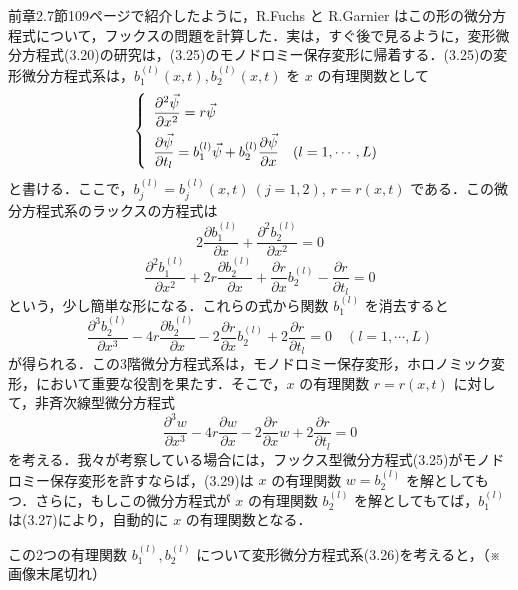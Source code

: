 \begin{story}
前章2.7節109ページで紹介したように，R.Fuchs と R.Garnier はこの形の微分方程式について，フックスの問題を計算した．実は，すぐ後で見るように，変形微分方程式(3.20)の研究は，(3.25)のモノドロミー保存変形に帰着する．(3.25)の変形微分方程式系は，$b_1^{(l)}(x,t), b_2^{(l)}(x,t)$ を $x$ の有理関数として
\begin{equation}
\left\{
\begin{array}{l}
    \displaystyle \frac{\partial^2 \vec{\psi}}{\partial x^2} = r\vec{\psi} \vspace{0.5em} \\
    \displaystyle \frac{\partial \vec{\psi}}{\partial t_l} = b_1^{(l)}\vec{\psi} + b_2^{(l)}\frac{\partial \vec{\psi}}{\partial x} \quad (l=1,\cdots,L)
\end{array}
\right. \label{eq:3.26}
\end{equation}
と書ける．ここで，$b_j^{(l)} = b_j^{(l)}(x,t) \ (j=1,2)$, $r = r(x,t)$ である．この微分方程式系のラックスの方程式は
\begin{equation}
    2\frac{\partial b_1^{(l)}}{\partial x} + \frac{\partial^2 b_2^{(l)}}{\partial x^2} = 0 \label{eq:3.27}
\end{equation}
\begin{equation}
    \frac{\partial^2 b_1^{(l)}}{\partial x^2} + 2r\frac{\partial b_2^{(l)}}{\partial x} + \frac{\partial r}{\partial x}b_2^{(l)} - \frac{\partial r}{\partial t_l} = 0 \label{eq:3.28}
\end{equation}
という，少し簡単な形になる．これらの式から関数 $b_1^{(l)}$ を消去すると
\begin{equation*}
    \frac{\partial^3 b_2^{(l)}}{\partial x^3} - 4r\frac{\partial b_2^{(l)}}{\partial x} - 2\frac{\partial r}{\partial x}b_2^{(l)} + 2\frac{\partial r}{\partial t_l} = 0 \quad (l=1,\cdots,L)
\end{equation*}
が得られる．この3階微分方程式系は，モノドロミー保存変形，ホロノミック変形，において重要な役割を果たす．そこで，$x$ の有理関数 $r = r(x,t)$ に対して，非斉次線型微分方程式
\begin{equation}
    \frac{\partial^3 w}{\partial x^3} - 4r\frac{\partial w}{\partial x} - 2\frac{\partial r}{\partial x}w + 2\frac{\partial r}{\partial t_l} = 0 \label{eq:3.29}
\end{equation}
を考える．我々が考察している場合には，フックス型微分方程式(3.25)がモノドロミー保存変形を許すならば，(3.29)は $x$ の有理関数 $w = b_2^{(l)}$ を解としてもつ．さらに，もしこの微分方程式が $x$ の有理関数 $b_2^{(l)}$ を解としてもてば，$b_1^{(l)}$ は(3.27)により，自動的に $x$ の有理関数となる．

この2つの有理関数 $b_1^{(l)}, b_2^{(l)}$ について変形微分方程式系(3.26)を考えると，（※画像末尾切れ）
\end{story}


